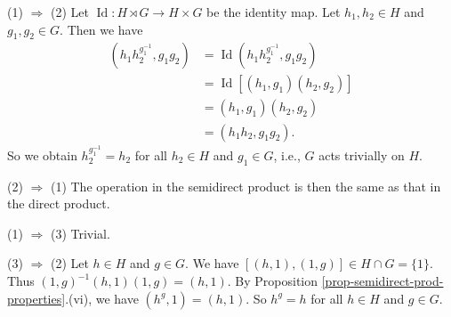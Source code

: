 \begin{sketch}
	(1) $\Rightarrow$ (2) Let $\operatorname{Id}:H \rtimes G\to H \times G$ be the identity map. Let $h_1, h_2 \in H$ and $g_1, g_2 \in G$. Then we have
	\begin{align*}
		(h_1  h_2^{g_1^{-1}}, g_1 g_2) &= \operatorname{Id}(h_1  h_2^{g_1^{-1}}, g_1 g_2)
		\\
		&=\operatorname{Id}[(h_1, g_1)(h_2, g_2) ]
		\\
		&= (h_1, g_1)(h_2, g_2)
		\\&=(h_1 h_2, g_1 g_2).
	\end{align*}
	So we obtain $h_2^{g_1^{-1}}= h_2$ for all $h_2 \in H$ and  $g_1 \in G$, i.e., $G$ acts trivially on $H$.
	
	(2) $\Rightarrow$ (1) The operation in the semidirect product is then the same as that in the direct product.
	
	(1) $\Rightarrow$ (3) Trivial.
	
	 (3) $\Rightarrow$ (2) Let $h\in H$ and $g\in G$. We have $[(h,1), (1,g)] \in H \cap G = \{1\}$. Thus $(1,g)^{-1}(h,1)(1,g) = (h,1)$. By Proposition \ref{prop-semidirect-prod-properties}.(vi), we have $(h^g,1) = (h,1)$. So $h^g =h$ for all $h\in H$ and $g\in G$.
\end{sketch} 
	
